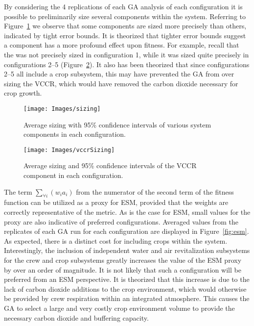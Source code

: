 \documentclass[submit]{aiaa}
\begin{document}
By considering the 4 replications of each GA analysis of each
configuration it is possible to preliminarily size several components
within the system. 
Referring to Figure~\ref{fig:compsize} we observe that some components
are sized more precisely than others, indicated by tight error
bounds. 
It is theorized that tighter error bounds
suggest a component has a more profound effect upon fitness. For example,
recall that the was not precisely
sized in configuration 1, while it was sized quite precisely in
configurations 2--5 (Figure~\ref{fig:vccrsize}). It also has been theorized that
since configurations
2--5 all include a crop subsystem, this may have prevented the GA from
over sizing the VCCR, which would have removed the carbon dioxide
necessary for crop growth.

\begin{figure}[htb]
\texttt{[image: Images/sizing]}
\caption{Average sizing with 95\% confidence intervals of various system components in each configuration.}
\label{fig:compsize}
\end{figure}

\begin{figure}[htb]
\texttt{[image: Images/vccrSizing]}
\caption{Average sizing and 95\% confidence intervals of the VCCR component in each
  configuration.}
\label{fig:vccrsize}
\end{figure}

The term $\sum_{\forall i} (w_ia_i)$ from the numerator of the second
term of the fitness function can be utilized as a proxy for ESM,
provided that the weights are correctly representative of the metric.
As is the case for ESM, small values for the proxy are also indicative
of preferred configurations.  Averaged values from the replicates of
each GA run for each configuration are displayed in
Figure~\ref{fig:esm}. 
As expected, there is a distinct cost for including crops within the system. 
Interestingly, the inclusion of independent  water and air revitalization subsystems for the crew and crop subsystems greatly increases the value of the ESM proxy by over an order of magnitude. 
It is not likely that such a configuration will be preferred from an ESM perspective. 
It is theorized that this increase is due to the lack of carbon dioxide additions to the crop environment,
which would otherwise be provided by crew respiration within an
integrated atmosphere. 
This causes the GA to select a large and very costly crop environment volume to provide the necessary carbon dioxide and buffering capacity.
\end{document}
